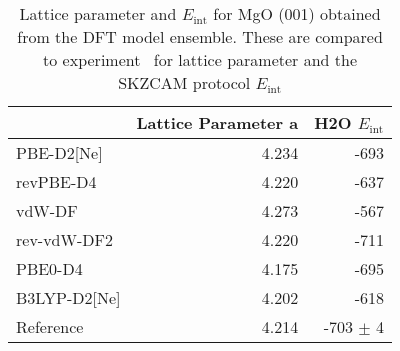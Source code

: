 \begin{table}
\caption{\label{tab:lattice_parametersmgo}Lattice parameter and  $E_\textrm{int}$ for MgO (001) obtained from the DFT model ensemble. These are compared to experiment~\cite{singhSynthesisCharacterizationAlkalineEarthOxide2018} for lattice parameter and the SKZCAM protocol $E_\textrm{int}$}
\begin{tabular}{lrr}
\toprule
 & Lattice Parameter a & H2O $E_\textrm{int}$ \\ 
\midrule
PBE-D2[Ne] & 4.234 & -693 \\
revPBE-D4 & 4.220 & -637 \\
vdW-DF & 4.273 & -567 \\
rev-vdW-DF2 & 4.220 & -711 \\
PBE0-D4 & 4.175 & -695 \\
B3LYP-D2[Ne] & 4.202 & -618 \\
Reference & 4.214 & -703 $\pm$ 4 \\
\bottomrule
\end{tabular}
\end{table}